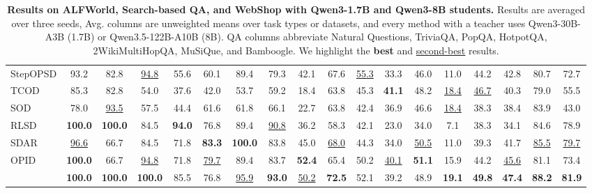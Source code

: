 \documentclass[10pt, logo, onecolumn, copyright]{nv}
\begin{document}
\begin{table}[t]
{\begin{tabular}{l@{\hspace{7pt}} ccccccc cccccccc cc}
StepOPSD
 & 93.2 & 82.8 & \cellcolor{cellsecond}\underline{94.8} & 55.6 & 60.1 & 89.4 & 79.3 & 42.1 & 67.6 & \cellcolor{cellsecond}\underline{55.3} & 33.3 & 46.0 & 11.0 & 44.2 & 42.8 & 80.7 & 72.7 \\
TCOD
 & 85.3 & 82.8 & 54.0 & 37.6 & 42.0 & 53.7 & 59.2 & 18.4 & 63.8 & 45.3 & \cellcolor{cellbest}\textbf{41.1} & 48.2 & \cellcolor{cellsecond}\underline{18.4} & \cellcolor{cellsecond}\underline{46.7} & 40.3 & 79.0 & 55.5 \\
SOD
 & 78.0 & \cellcolor{cellsecond}\underline{93.5} & 57.5 & 44.4 & 61.6 & 61.8 & 66.1 & 22.7 & 63.8 & 42.4 & 36.9 & 46.6 & \cellcolor{cellsecond}\underline{18.4} & 38.3 & 38.4 & 83.9 & 43.0 \\
RLSD
 & \cellcolor{cellbest}\textbf{100.0} & \cellcolor{cellbest}\textbf{100.0} & 84.5 & \cellcolor{cellbest}\textbf{94.0} & 76.8 & 89.4 & \cellcolor{cellsecond}\underline{90.8} & 36.2 & 58.3 & 42.1 & 23.0 & 34.0 & 7.1 & 38.3 & 34.1 & 84.6 & 78.9 \\
SDAR
 & \cellcolor{cellsecond}\underline{96.6} & 66.7 & 84.5 & 71.8 & \cellcolor{cellbest}\textbf{83.3} & \cellcolor{cellbest}\textbf{100.0} & 83.8 & 45.0 & \cellcolor{cellsecond}\underline{68.0} & 44.3 & 34.0 & \cellcolor{cellsecond}\underline{50.5} & 11.0 & 39.3 & 41.7 & \cellcolor{cellsecond}\underline{85.5} & \cellcolor{cellsecond}\underline{79.7} \\
OPID
 & \cellcolor{cellbest}\textbf{100.0} & 66.7 & \cellcolor{cellsecond}\underline{94.8} & 71.8 & \cellcolor{cellsecond}\underline{79.7} & 89.4 & 83.7 & \cellcolor{cellbest}\textbf{52.4} & 65.4 & 50.2 & \cellcolor{cellsecond}\underline{40.1} & \cellcolor{cellbest}\textbf{51.1} & 15.9 & 44.2 & \cellcolor{cellsecond}\underline{45.6} & 81.1 & 73.4 \\
\textbf{\method{}}
 & \cellcolor{cellbest}\textbf{100.0} & \cellcolor{cellbest}\textbf{100.0} & \cellcolor{cellbest}\textbf{100.0} & 85.5 & 76.8 & \cellcolor{cellsecond}\underline{95.9} & \cellcolor{cellbest}\textbf{93.0} & \cellcolor{cellsecond}\underline{50.2} & \cellcolor{cellbest}\textbf{72.5} & 52.1 & 39.2 & 48.9 & \cellcolor{cellbest}\textbf{19.1} & \cellcolor{cellbest}\textbf{49.8} & \cellcolor{cellbest}\textbf{47.4} & \cellcolor{cellbest}\textbf{88.2} & \cellcolor{cellbest}\textbf{81.9} \\
\bottomrule
\end{tabular}}
\vspace{5pt}
\caption{\small \textbf{Results on ALFWorld, Search-based QA, and WebShop with Qwen3-1.7B and Qwen3-8B students.} Results are averaged over three seeds, Avg. columns are unweighted means over task types or datasets, and every method with a teacher uses Qwen3-30B-A3B (1.7B) or Qwen3.5-122B-A10B (8B). QA columns abbreviate Natural Questions, TriviaQA, PopQA, HotpotQA, 2WikiMultiHopQA, MuSiQue, and Bamboogle. We highlight the \colorbox{cellbest}{\textbf{best}} and \colorbox{cellsecond}{\underline{second-best}} results.}
\label{tab:main_results}
\end{table}
\end{document}
